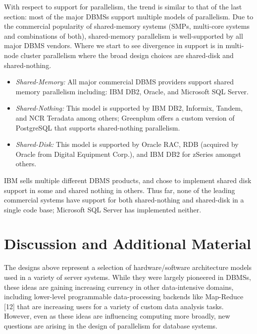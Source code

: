 \documentclass[a4paper,11pt,twoside,openright]{book}
\begin{document}
With respect to support for parallelism, the trend is similar to that of
the last section: most of the major DBMSs support multiple models of
parallelism. Due to the commercial popularity of shared-memory systems
(SMPs, multi-core systems and combinations of both), shared-memory
parallelism is well-supported by all major DBMS vendors. Where we start
to see divergence in support is in multi-node cluster parallelism where
the broad design choices are shared-disk and shared-nothing.

\begin{itemize}

\item
  \emph{Shared-Memory:} All major commercial DBMS providers
support shared memory parallelism including: IBM DB2, Oracle, and
Microsoft SQL Server.
\item
  \emph{Shared-Nothing:} This model is supported by IBM DB2, Informix,
  Tandem, and NCR Teradata among others; Greenplum offers a custom
  version of PostgreSQL that supports shared-nothing parallelism.
\item
  \emph{Shared-Disk:} This model is supported by Oracle RAC, RDB
  (acquired by Oracle from Digital Equipment Corp.), and IBM DB2 for
  zSeries amongst others.
\end{itemize}

IBM sells multiple different DBMS products, and chose to implement
shared disk support in some and shared nothing in others. Thus far, none
of the leading commercial systems have support for both shared-nothing
and shared-disk in a single code base; Microsoft SQL Server has
implemented neither.

\hypertarget{discussion-and-additional-material-1}{%
\section{Discussion and Additional
Material}\label{discussion-and-additional-material-1}}

The designs above represent a selection of hardware/software
architecture models used in a variety of server systems. While they were
largely pioneered in DBMSs, these ideas are gaining increasing currency
in other data-intensive domains, including lower-level programmable
data-processing backends like Map-Reduce {[}12{]} that are increasing
users for a variety of custom data analysis tasks. However, even as
these ideas are influencing computing more broadly, new questions are
arising in the design of parallelism for database systems.
\end{document}
